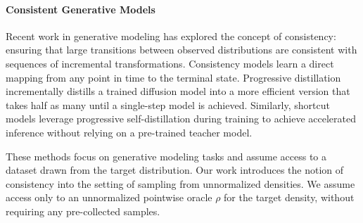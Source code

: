 \paragraph{Consistent Generative Models}
Recent work in generative modeling has explored the concept of consistency: ensuring that large transitions between observed distributions are consistent with sequences of incremental transformations. 
Consistency models \citep{song2023consistency, song2023improved, lu2025simplifying} 
learn a direct mapping from any point in time to the terminal state. 
Progressive distillation \citep{salimans2022progdist, meng2023distillation} incrementally distills a trained diffusion model into a more efficient version that takes half as many until a single-step model is achieved.
Similarly, shortcut models \citep{liu2023flowstraight, frans2025shortcut} leverage progressive self-distillation during training to achieve accelerated inference without relying on a pre-trained teacher model.

These methods focus on generative modeling tasks and assume access to a dataset drawn from the target distribution.
Our work introduces the notion of consistency into the setting of sampling from unnormalized densities. 
We assume access only to an unnormalized pointwise oracle $\rho$ for the target density, without requiring any pre-collected samples.
